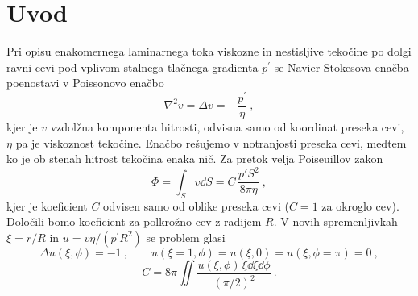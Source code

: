 \documentclass{article}
\begin{document}
\section{Uvod}
Pri opisu enakomernega laminarnega toka viskozne in nestisljive
tekočine po dolgi ravni cevi pod vplivom stalnega tlačnega
gradienta $p^{\prime}$ se Navier-Stokesova enačba poenostavi
v Poissonovo enačbo
\begin{equation*}
  \nabla^2 v = \Delta v = - \frac{p^\prime}{\eta}\>,
\end{equation*}
kjer je $v$ vzdolžna komponenta hitrosti, odvisna samo  od
koordinat preseka cevi, $\eta$ pa je viskoznost tekočine.
Enačbo rešujemo v notranjosti preseka cevi, medtem ko
je ob stenah hitrost tekočina enaka nič.  Za pretok velja
Poiseuillov zakon
\begin{equation*}
  \Phi = \int_S v\dd S = C\,\frac{p' S^2}{ 8\pi\eta} \>,
\end{equation*}
kjer je koeficient $C$ odvisen samo od oblike preseka cevi
($C=1$ za okroglo cev).  Določili bomo koeficient za
polkrožno cev z radijem $R$. V novih spremenljivkah $\xi=r/R$
in $u=v \eta/(p^\prime R^2)$ se problem glasi
\begin{equation*}
\Delta u(\xi,\phi) = -1 \>,\qquad
u(\xi=1,\phi)=u(\xi,0)=u(\xi,\phi=\pi)=0 \>,
\end{equation*}
\begin{equation*}
  C = 8\pi \iint \frac{u(\xi,\phi)\,\xi\dd \xi \dd\phi}{ (\pi/2)^2} \>.
\end{equation*}
\end{document}
